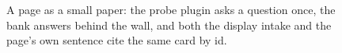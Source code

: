 \begin{figure}[t]
  \centering
  
  \caption{A page as a small paper: the probe plugin asks a question once, the
  bank answers behind the wall, and both the display intake and the page's own
  sentence cite the same card by id.}
  \label{fig:qpf5-small-paper}
\end{figure}
